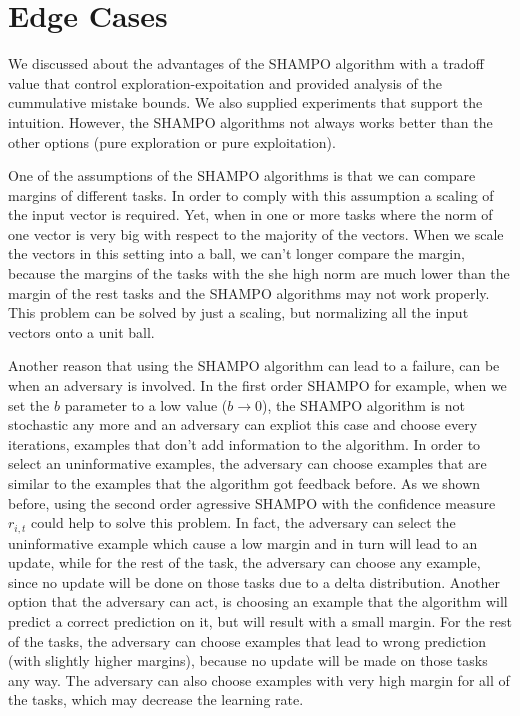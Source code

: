 \section{Edge Cases}
We discussed about the advantages of the SHAMPO algorithm with a tradoff value that control 
exploration-expoitation and  provided analysis of the cummulative mistake 
bounds. We also supplied experiments that support the intuition.  However, the 
SHAMPO algorithms not always works better than the other options (pure exploration or pure 
exploitation). 

One of the assumptions of  the SHAMPO algorithms is that we can 
compare margins of different tasks. In order to comply with this  assumption 
a scaling of the input vector is required. Yet, when in one or more tasks 
where  the norm of one vector is very big with respect to the majority of the 
vectors. When we scale the vectors in this setting into a ball, we can't longer compare the 
margin, because the margins of the tasks with the she high  norm are much lower 
than the margin of the rest tasks and the SHAMPO algorithms may not work properly. 
This problem can be solved by just a scaling, but normalizing all the input 
vectors onto a unit ball.

Another reason that using the SHAMPO algorithm can lead to a failure, can be 
when an adversary is involved. In the first order SHAMPO for example, when we 
set the $b$ parameter to a low value ($b \rightarrow 0$), the SHAMPO algorithm 
is not stochastic any more and an adversary can expliot this case and choose 
every iterations, examples that don't add information to the algorithm. In order to select an uninformative 
examples, the adversary can choose  examples that are similar to the examples 
that the algorithm got feedback before. As we shown before, using the second order agressive 
SHAMPO with the confidence measure $r_{i,t}$ could help to solve this problem.
 In fact, the adversary can select the 
uninformative example which cause a low margin and in turn will lead to an update, while for the rest 
of the task, the adversary can choose any example, since no update will be done on those 
tasks due to a delta distribution. Another option that the adversary can act, is 
choosing an example that the algorithm will predict a correct prediction on it, 
but will result with a small margin. For the rest of the tasks, the adversary 
can choose examples that lead to wrong prediction (with slightly higher margins), because no update will be 
made on those tasks any way. The adversary can also choose  examples with very high margin for all of the tasks, 
which may decrease the learning rate. 

